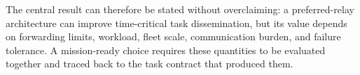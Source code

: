 The central result can therefore be stated without overclaiming: a preferred-relay architecture can improve time-critical task dissemination, but its value depends on forwarding limits, workload, fleet scale, communication burden, and failure tolerance. A mission-ready choice requires these quantities to be evaluated together and traced back to the task contract that produced them.

